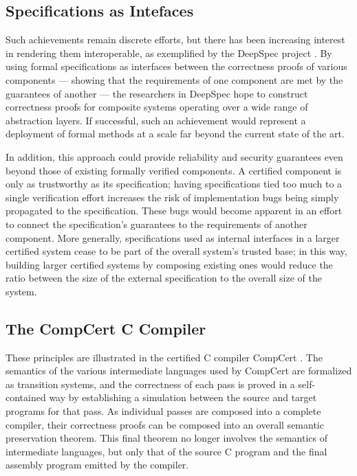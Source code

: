 \documentclass[acmsmall,timestamp,review,anonymous]{acmart}
\begin{document}

\subsection{Specifications as Intefaces} %

Such achievements remain discrete efforts, but
there has been increasing interest in rendering them interoperable,
as exemplified by the DeepSpec project \cite{deepspec}.
By using formal specifications as interfaces
between the correctness proofs of various components ---
showing that the requirements of one component
are met by the guarantees of another ---
the researchers in DeepSpec hope to
construct correctness proofs for composite systems
operating over a wide range of abstraction layers.
If successful,
such an achievement would represent a deployment of formal methods
at a scale far beyond the current state of the art.

In addition,
this approach could provide reliability and security guarantees
even beyond those of existing formally verified components.
A certified component is only as trustworthy as its specification;
having specifications tied too much to a single verification effort
increases the risk of
implementation bugs being simply propagated to
the specification.
These bugs would become apparent in an effort to
connect the specification's guarantees to
the requirements of another component.
More generally,
specifications used as internal interfaces
in a larger certified system cease to be part of
the overall system's trusted base;
in this way,
building larger certified systems
by composing existing ones
would reduce the
ratio between the size of the external specification to
the overall size of the system.


\subsection{The CompCert C Compiler} %

These principles are illustrated in
the certified C compiler CompCert \cite{compcert}.
The semantics of the various intermediate languages
used by CompCert are formalized as transition systems,
and the correctness of each pass is proved
in a self-contained way
by establishing a simulation between
the source and target programs for that pass.
As individual passes are composed into a complete compiler,
their correctness proofs can be composed into
an overall semantic preservation theorem.
This final theorem no longer involves
the semantics of intermediate languages,
but only that of the source C program
and the final assembly program emitted by the compiler.
\end{document}
